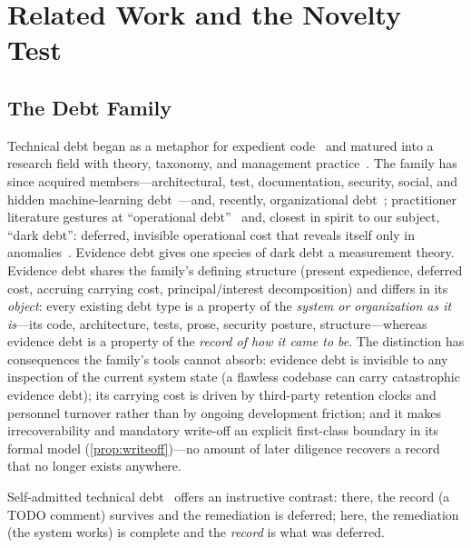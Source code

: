 \section{Related Work and the Novelty Test}
\label{sec:related}

\subsection{The Debt Family}
\label{sec:rel-family}
Technical debt began as a metaphor for expedient code~\cite{cunningham1992} and
matured into a research field with theory, taxonomy, and management
practice~\cite{kruchten2012,li2015,tom2013,alves2016,seaman2011,ernst2015}. The
family has since acquired members---architectural, test, documentation, security,
social, and hidden machine-learning debt~\cite{alves2016,rindell2019,tamburri2013,
sculley2015,avgeriou2016}---and, recently, organizational debt~\cite{alami2024};
practitioner literature gestures at ``operational debt''~\cite{owczarek2019} and,
closest in spirit to our subject, ``dark debt'': deferred, invisible operational
cost that reveals itself only in anomalies~\cite{stella2017}. Evidence debt gives
one species of dark debt a measurement theory. Evidence debt shares the family's defining structure
(present expedience, deferred cost, accruing carrying cost, principal/interest
decomposition) and differs in its \emph{object}: every existing debt type is a
property of the \emph{system or organization as it is}---its code, architecture,
tests, prose, security posture, structure---whereas evidence debt is a property of
the \emph{record of how it came to be}. The distinction has consequences the family's
tools cannot absorb: evidence debt is invisible to any inspection of the current
system state (a flawless codebase can carry catastrophic evidence debt); its
carrying cost is driven by third-party retention clocks and personnel turnover
rather than by ongoing development friction; and it makes irrecoverability and
mandatory write-off an explicit first-class boundary in its formal model
(\cref{prop:writeoff})---no amount of later diligence recovers a record that no
longer exists anywhere.

Self-admitted technical debt~\cite{potdar2014} offers an instructive contrast:
there, the record (a TODO comment) survives and the remediation is deferred; here,
the remediation (the system works) is complete and the \emph{record} is what was
deferred.

